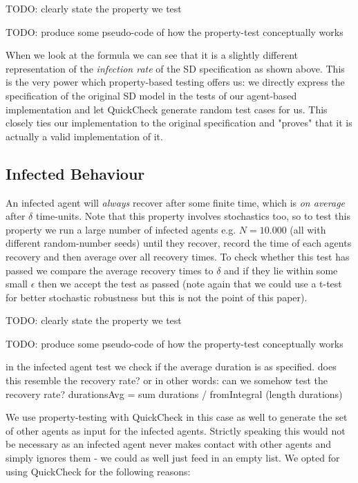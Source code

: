TODO: clearly state the property we test

TODO: produce some pseudo-code of how the property-test conceptually works

When we look at the formula we can see that it is a slightly different representation of the \textit{infection rate} of the SD specification as shown above. This is the very power which property-based testing offers us: we directly express the specification of the original SD model in the tests of our agent-based implementation and let QuickCheck generate random test cases for us. This closely ties our implementation to the original specification and "proves" that it is actually a valid implementation of it.

\subsection{Infected Behaviour}
An infected agent will \textit{always} recover after some finite time, which is \textit{on average} after $\delta$ time-units. Note that this property involves stochastics too, so to test this property we run a large number of infected agents e.g. $N = 10.000$ (all with different random-number seeds) until they recover, record the time of each agents recovery and then average over all recovery times. To check whether this test has passed we compare the average recovery times to $\delta$ and if they lie within some small $\epsilon$ then we accept the test as passed (note again that we could use a t-test for better stochastic robustness but this is not the point of this paper).

TODO: clearly state the property we test

TODO: produce some pseudo-code of how the property-test conceptually works

in the infected agent test we check if the average duration is as specified. does this resemble the recovery rate? or in other words: can we somehow test the recovery rate?
durationsAvg = sum durations / fromIntegral (length durations)

We use property-testing with QuickCheck in this case as well to generate the set of other agents as input for the infected agents. Strictly speaking this would not be necessary as an infected agent never makes contact with other agents and simply ignores them - we could as well just feed in an empty list. We opted for using QuickCheck for the following reasons:

